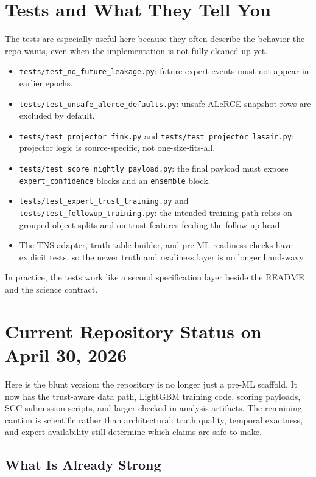 \documentclass[11pt]{article}
\newcommand{\code}[1]{\texttt{#1}}
\begin{document}
\section{Tests and What They Tell You}

The tests are especially useful here because they often describe the behavior the repo wants, even when the implementation is not fully cleaned up yet.

\begin{itemize}
\item \code{tests/test\_no\_future\_leakage.py}: future expert events must not appear in earlier epochs.
\item \code{tests/test\_unsafe\_alerce\_defaults.py}: unsafe ALeRCE snapshot rows are excluded by default.
\item \code{tests/test\_projector\_fink.py} and \code{tests/test\_projector\_lasair.py}: projector logic is source-specific, not one-size-fits-all.
\item \code{tests/test\_score\_nightly\_payload.py}: the final payload must expose \code{expert\_confidence} blocks and an \code{ensemble} block.
\item \code{tests/test\_expert\_trust\_training.py} and \code{tests/test\_followup\_training.py}: the intended training path relies on grouped object splits and on trust features feeding the follow-up head.
\item The TNS adapter, truth-table builder, and pre-ML readiness checks have explicit tests, so the newer truth and readiness layer is no longer hand-wavy.
\end{itemize}

In practice, the tests work like a second specification layer beside the README and the science contract.

\section{Current Repository Status on April 30, 2026}

Here is the blunt version: the repository is no longer just a pre-ML scaffold. It now has the trust-aware data path, LightGBM training code, scoring payloads, SCC submission scripts, and larger checked-in analysis artifacts. The remaining caution is scientific rather than architectural: truth quality, temporal exactness, and expert availability still determine which claims are safe to make.

\subsection{What Is Already Strong}
\end{document}
